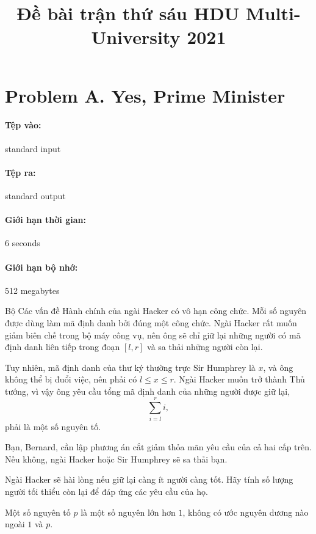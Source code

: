 \documentclass[11pt]{article}
\title{Đề bài trận thứ sáu HDU Multi-University 2021}
\author{}
\date{}
\begin{document}
\maketitle


\section{Problem A. Yes, Prime Minister}

\paragraph{Tệp vào:} standard input
\paragraph{Tệp ra:} standard output
\paragraph{Giới hạn thời gian:} 6 seconds
\paragraph{Giới hạn bộ nhớ:} 512 megabytes

Bộ Các vấn đề Hành chính của ngài Hacker có vô hạn công chức. Mỗi số nguyên
được dùng làm mã định danh bởi đúng một công chức. Ngài Hacker rất muốn giảm
biên chế trong bộ máy công vụ, nên ông sẽ chỉ giữ lại những người có mã định
danh liên tiếp trong đoạn \([l,r]\) và sa thải những người còn lại.

Tuy nhiên, mã định danh của thư ký thường trực Sir Humphrey là \(x\), và ông
không thể bị đuổi việc, nên phải có \(l\le x\le r\). Ngài Hacker muốn trở
thành Thủ tướng, vì vậy ông yêu cầu tổng mã định danh của những người được
giữ lại,
\[
  \sum_{i=l}^{r} i,
\]
phải là một số nguyên tố.

Bạn, Bernard, cần lập phương án cắt giảm thỏa mãn yêu cầu của cả hai cấp
trên. Nếu không, ngài Hacker hoặc Sir Humphrey sẽ sa thải bạn.

Ngài Hacker sẽ hài lòng nếu giữ lại càng ít người càng tốt. Hãy tính số
lượng người tối thiểu còn lại để đáp ứng các yêu cầu của họ.

Một số nguyên tố \(p\) là một số nguyên lớn hơn \(1\), không có ước nguyên
dương nào ngoài \(1\) và \(p\).
\end{document}
